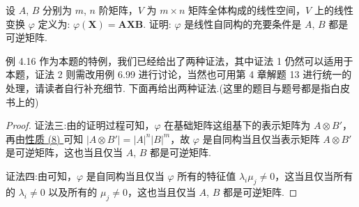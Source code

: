 \documentclass[../../main.tex]{subfiles}%
\begin{document}
\begin{example}
设 $A$, $B$ 分别为 $m$, $n$ 阶矩阵，$V$ 为 $m\times n$ 矩阵全体构成的线性空间，$V$ 上的线性变换 $\varphi$ 定义为: $\varphi(\boldsymbol{X}) = \boldsymbol{A}\boldsymbol{X}\boldsymbol{B}$. 证明: $\varphi$ 是线性自同构的充要条件是 $A$, $B$ 都是可逆矩阵.
\end{example}
\begin{remark}
例 4.16 作为本题的特例，我们已经给出了两种证法，其中证法 1 仍然可以适用于本题，证法 2 则需改用例 6.99 进行讨论，当然也可用第 4 章解题 13 进行统一的处理，请读者自行补充细节. 下面再给出两种证法.(这里的题目与题号都是指白皮书上的)
\end{remark}
\begin{proof}

{\color{blue}证法三:}由的证明过程可知，$\varphi$ 在基础矩阵这组基下的表示矩阵为 $A\otimes B'$，再由\hyperref[矩阵的Kronecker积的基本性质(8)]{性质 (8) }可知 $|A\otimes B'| = |A|^n|B|^m$，故 $\varphi$ 是自同构当且仅当表示矩阵 $A\otimes B'$ 是可逆矩阵，这也当且仅当 $A$, $B$ 都是可逆矩阵.

{\color{blue}证法四:}由可知，$\varphi$ 是自同构当且仅当 $\varphi$ 所有的特征值 $\lambda_i\mu_j\neq 0$，这当且仅当所有的 $\lambda_i\neq 0$ 以及所有的 $\mu_j\neq 0$，这也当且仅当 $A$, $B$ 都是可逆矩阵.

\end{proof}
\end{document}
